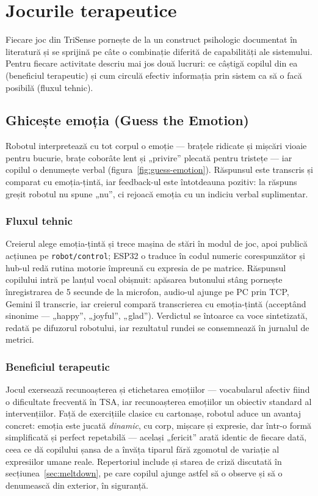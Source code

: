 \section{Jocurile terapeutice}

Fiecare joc din TriSense pornește de la un construct psihologic documentat în literatură și se sprijină pe câte o combinație diferită de capabilități ale sistemului. Pentru fiecare activitate descriu mai jos două lucruri: ce câștigă copilul din ea (beneficiul terapeutic) și cum circulă efectiv informația prin sistem ca să o facă posibilă (fluxul tehnic).

\subsection{Ghicește emoția (Guess the Emotion)}

Robotul interpretează cu tot corpul o emoție — brațele ridicate și mișcări vioaie pentru bucurie, brațe coborâte lent și „privire” plecată pentru tristețe — iar copilul o denumește verbal (figura~\ref{fig:guess-emotion}). Răspunsul este transcris și comparat cu emoția-țintă, iar feedback-ul este întotdeauna pozitiv: la răspuns greșit robotul nu spune „nu”, ci rejoacă emoția cu un indiciu verbal suplimentar.

\subsubsection*{Fluxul tehnic}
Creierul alege emoția-țintă și trece mașina de stări în modul de joc, apoi publică acțiunea pe \texttt{robot/control}; ESP32 o traduce în codul numeric corespunzător și hub-ul redă rutina motorie împreună cu expresia de pe matrice. Răspunsul copilului intră pe lanțul vocal obișnuit: apăsarea butonului stâng pornește înregistrarea de 5 secunde de la microfon, audio-ul ajunge pe PC prin TCP, Gemini îl transcrie, iar creierul compară transcrierea cu emoția-țintă (acceptând sinonime — „happy”, „joyful”, „glad”). Verdictul se întoarce ca voce sintetizată, redată pe difuzorul robotului, iar rezultatul rundei se consemnează în jurnalul de metrici.

\subsubsection*{Beneficiul terapeutic}
Jocul exersează recunoașterea și etichetarea emoțiilor — vocabularul afectiv fiind o dificultate frecventă în TSA, iar recunoașterea emoțiilor un obiectiv standard al intervențiilor. Față de exercițiile clasice cu cartonașe, robotul aduce un avantaj concret: emoția este jucată \emph{dinamic}, cu corp, mișcare și expresie, dar într-o formă simplificată și perfect repetabilă — același „fericit” arată identic de fiecare dată, ceea ce dă copilului șansa de a învăța tiparul fără zgomotul de variație al expresiilor umane reale. Repertoriul include și starea de criză discutată în secțiunea~\ref{sec:meltdown}, pe care copilul ajunge astfel să o observe și să o denumească din exterior, în siguranță.

